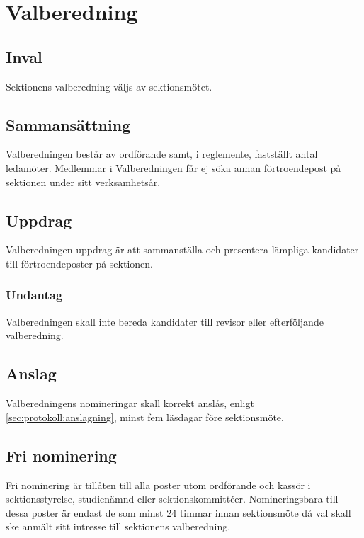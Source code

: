 \section{Valberedning}

\subsection{Inval}
Sektionens valberedning väljs av sektionsmötet.

\subsection{Sammansättning}
Valberedningen består av ordförande samt, i reglemente, fastställt antal ledamöter. Medlemmar i Valberedningen får ej söka annan förtroendepost på sektionen under sitt verksamhetsår.

\subsection{Uppdrag}
Valberedningen uppdrag är att sammanställa och presentera lämpliga kandidater till förtroendeposter på sektionen.

\subsubsection{Undantag}
Valberedningen skall inte bereda kandidater till revisor eller efterföljande valberedning.

\subsection{Anslag}
Valberedningens nomineringar skall korrekt anslås, enligt \ref{sec:protokoll:anslagning}, minst fem läsdagar före sektionsmöte.

\subsection{Fri nominering}
Fri nominering är tillåten till alla poster utom ordförande och kassör i sektionsstyrelse, studienämnd eller sektionskommittéer. Nomineringsbara till dessa poster är endast de som minst 24 timmar innan sektionsmöte då val skall ske anmält sitt intresse till sektionens valberedning.
